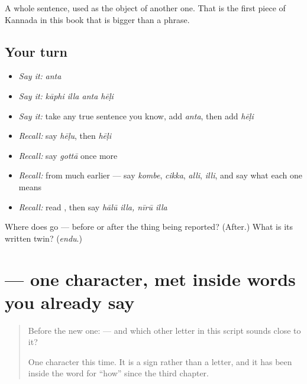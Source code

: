 \begin{grammarlens}[title={What you've built}]
A whole sentence, used as the object of another one. That is the first piece of Kannada in this book that is bigger than a phrase.
\end{grammarlens}

\subsection*{Your turn}
\begin{itemize}
\raggedright
  \item \emph{Say it:} \emph{anta}
  \item \emph{Say it:} \emph{kāphi illa anta hēḷi}
  \item \emph{Say it:} take any true sentence you know, add \emph{anta}, then add \emph{hēḷi}
  \item \emph{Recall:} say \emph{hēḷu}, then \emph{hēḷi}
  \item \emph{Recall:} say \emph{gottā} once more
  \item \emph{Recall:} from much earlier — say \emph{kombe}, \emph{cikka}, \emph{alli}, \emph{illi}, and say what each one means
  \item \emph{Recall:} read \textbf{}, then say \emph{hālū illa, nīrū illa}
\end{itemize}

\begin{tcolorbox}[breakable,colback=teal!4,colframe=teal!35!black,title={Before you move on}]
Where does  go — before or after the thing being reported? (After.) What is its written twin? (\emph{endu}.)
\end{tcolorbox}
\section[\texorpdfstring{\kn{ೇ} (ē)}{ೇ (ē)}]{ — one character, met inside words you already say}

\label{lesson:KA-S138-vowel-sign-ee}



\begin{quote}
Before the new one:  — and which other letter in this script sounds close to it?

One character this time. It is a sign rather than a letter, and it has been inside the word for \textquotedblleft{}how\textquotedblright{} since the third chapter.
\end{quote}


